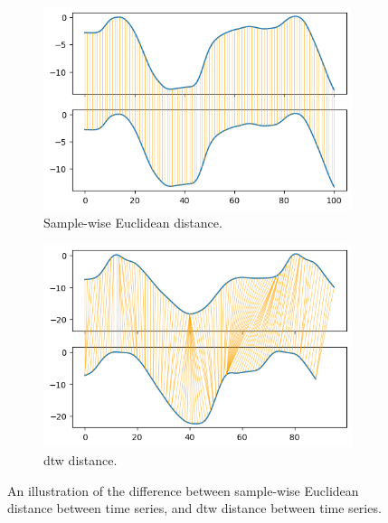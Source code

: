 \begin{figure}
    \centering
    \begin{subfigure}[b]{0.49\textwidth}
        \centering
        \includegraphics[width=0.99\textwidth]{machine-learning/warping_lines_1_curve.png}
        \caption{Sample-wise Euclidean distance.}
        \label{fig:ed_ex}
    \end{subfigure}
    \begin{subfigure}[b]{0.49\textwidth}
        \centering
        \includegraphics[width=0.99\textwidth]{machine-learning/warping_lines_2_curves.png}
        \caption{\acrshort{dtw} distance.}
        \label{fig:dtw_ex}
    \end{subfigure}
    \caption{An illustration of the difference between sample-wise Euclidean distance between time series, and \acrshort{dtw} distance between time series.}
    \label{fig:ed_dtw_ex}
\end{figure}

